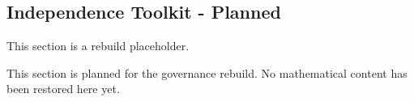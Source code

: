 \subsection*{Independence Toolkit - Planned}

This section is a rebuild placeholder.

This section is planned for the governance rebuild. No mathematical content has
been restored here yet.
